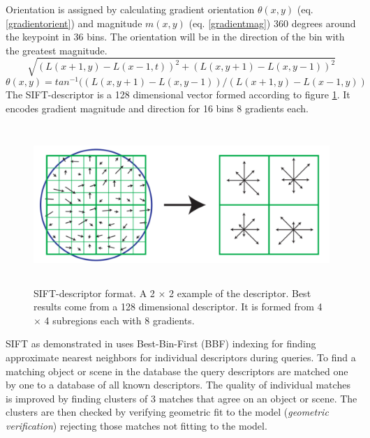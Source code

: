 \documentclass[english,12pt,a4paper,pdftex,elec,utf8, table]{aaltothesis}
\begin{document}
Orientation is assigned by calculating gradient orientation $\theta(x,y)$ (eq. \ref{gradientorient}) and magnitude $m(x,y)$ (eq. \ref{gradientmag}) 360 degrees around the keypoint in 36 bins. The orientation will be in the direction of the bin with the greatest magnitude.
\begin{equation}\label{gradientmag}
\sqrt{(L(x+1,y)-L(x-1,t))^2 + (L(x, y+1)- L(x, y-1))^2}
\end{equation}
\begin{equation}\label{gradientorient}
\theta(x,y) = tan^{-1}((L(x, y+1)- L(x,y-1))/ (L(x+1,y)-L(x-1,y))
\end{equation}
The SIFT-descriptor is a 128 dimensional vector formed according to figure \ref{siftdescriptor}. It encodes gradient magnitude and direction for 16 bins 8 gradients each.
\begin{figure}[htb]
\begin{center}
\includegraphics[height=6cm]{figures/siftDescriptorFormat}
\end{center}
\caption{SIFT-descriptor format. A 2 $\times$ 2 example of the descriptor. Best results come from a 128 dimensional descriptor. It is formed from 4 $\times$ 4 subregions each with 8 gradients. \cite{Lowe2004}}
\label{siftdescriptor}
\end{figure}
SIFT as demonstrated in \cite{Lowe2004} uses Best-Bin-First (BBF) indexing for finding approximate nearest neighbors for individual descriptors during queries. To find a matching object or scene in the database the query descriptors are matched one by one to a database of all known descriptors. The quality of individual matches is improved by finding clusters of 3 matches that agree on an object or scene. The clusters are then checked by verifying geometric fit to the model (\emph{geometric verification}) rejecting those matches not fitting to the model.
\end{document}
